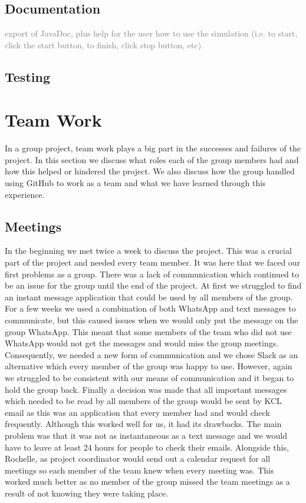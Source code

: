 \documentclass{article}
\begin{document}
	
	\subsection{Documentation}
	\textcolor{gray}{export of JavaDoc, plus help for the user how to use the simulation (i.e. to start, click the start button, to finish, click stop button, etc).}
	
	
	\subsection{Testing}
  




	
	\section{Team Work}
	In a group project, team work plays a big part in the successes and failures of the project. In this section we discuss what roles each of the group members had and how this helped or hindered the project. We also discuss how the group handled using GitHub to work as a team and what we have learned through this experience. 
	
	\subsection{Meetings}
	In the beginning we met twice a week to discuss the project. 
	This was a crucial part of the project and needed every team member. 
	It was here that we faced our first problems as a group. 
	There was a lack of communication which continued to be an issue for the group until the end of the project. 
	At first we struggled to find an instant message application that could be used by all members of the group. 
	For a few weeks we used a combination of both WhatsApp and text messages to communicate, but this caused issues when we would only put the message on the group WhatsApp. 
	This meant that some members of the team who did not use WhatsApp would not get the messages and would miss the group meetings. 
	Consequently, we needed a new form of communication and we chose Slack as an alternative which every member of the group was happy to use. 
	However, again we struggled to be consistent with our means of communication and it began to hold the group back. 
	Finally a decision was made that all important messages which needed to be read by all members of the group would be sent by KCL email as this was an application that every member had and would check frequently. 
	Although this worked well for us, it had its drawbacks. 
	The main problem was that it was not as instantaneous as a text message and we would have to leave at least 24 hours for people to check their emails. 
	Alongside this, Rochelle, as project coordinator would send out a calendar request for all meetings so each member of the team knew when every meeting was. 
	This worked much better as no member of the group missed the team meetings as a result of not knowing they were taking place. 
	
\end{document}
